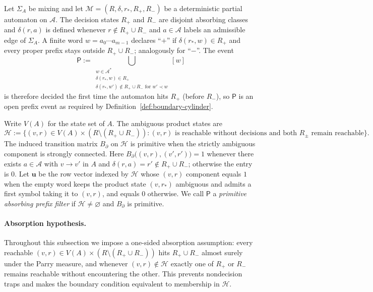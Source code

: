 \begin{definition}
\label{def:hidden-markov-filter}
Let $\Sigma_A$ be mixing and let
$\mathcal{M}=(R,\delta,r_\ast,R_+,R_-)$ be a deterministic partial automaton on
$\mathcal{A}$.  The decision states $R_+$ and $R_-$ are disjoint absorbing
classes and $\delta(r,a)$ is defined whenever $r\notin R_+\cup R_-$ and
$a\in\mathcal{A}$ labels an admissible edge of $\Sigma_A$.  A finite word
$w=a_0\cdots a_{m-1}$ declares ``$+$'' if $\delta(r_\ast,w)\in R_+$ and every
proper prefix stays outside $R_+\cup R_-$; analogously for ``$-$''.  The event
\[
\mathsf{P}:=\bigcup_{\substack{w\in\mathcal{A}^\ast\\
    \delta(r_\ast,w)\in R_+\\
    \delta(r_\ast,w')\notin R_+\cup R_- \text{ for }w'\prec w}}[w]
\]
is therefore decided the first time the automaton hits $R_+$ (before $R_-$),
so $\mathsf{P}$ is an open prefix event as required by
Definition~\ref{def:boundary-cylinder}.

Write $V(A)$ for the state set of $A$.  The ambiguous product states are
\[
\mathcal{H}:=\{(v,r)\in V(A)\times (R\setminus(R_+\cup R_-)):
 \text{$(v,r)$ is reachable without decisions and both $R_\pm$ remain reachable}\}.
\]
The induced transition matrix $B_\partial$ on $\mathcal{H}$ is primitive when the
strictly ambiguous component is strongly connected.  Here
$B_\partial\bigl((v,r),(v',r')\bigr)=1$ whenever there exists
$a\in\mathcal{A}$ with $v\to v'$ in $A$ and $\delta(r,a)=r'\notin R_+\cup R_-$;
otherwise the entry is $0$.  Let $\mathbf{u}$ be the row vector indexed by
$\mathcal{H}$ whose $(v,r)$ component equals $1$ when the empty word keeps the
product state $(v,r_\ast)$ ambiguous and admits a first symbol taking it to
$(v,r)$, and equals $0$ otherwise.  We call $\mathsf{P}$ a
\emph{primitive absorbing prefix filter} if $\mathcal{H}\ne\varnothing$ and
$B_\partial$ is primitive.
\end{definition}

\paragraph{Absorption hypothesis.}
Throughout this subsection we impose a one-sided absorption assumption:
every reachable $(v,r)\in V(A)\times (R\setminus(R_+\cup R_-))$ hits
$R_+\cup R_-$ almost surely under the Parry measure, and whenever
$(v,r)\notin\mathcal{H}$ exactly one of $R_+$ or $R_-$ remains reachable
without encountering the other.  This prevents nondecision traps and makes
the boundary condition equivalent to membership in $\mathcal{H}$.

